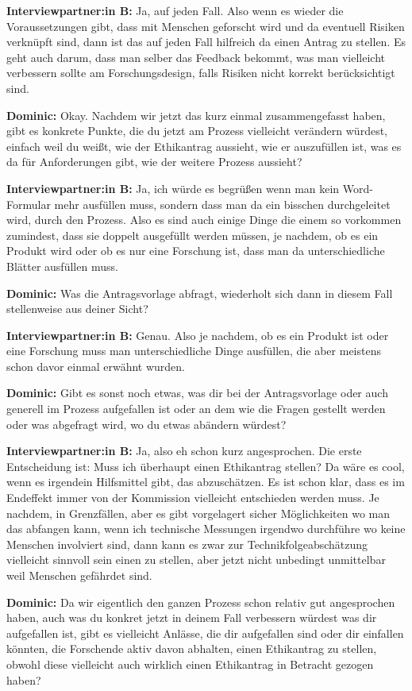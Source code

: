 \documentclass[a4paper,12pt,twoside]{scrreprt}
\begin{document}
\textbf{Interviewpartner:in B:} Ja, auf jeden Fall. Also wenn es wieder die Voraussetzungen gibt, dass mit Menschen geforscht wird und da eventuell Risiken verknüpft sind, dann ist das auf jeden Fall hilfreich da einen Antrag zu stellen. Es geht auch darum, dass man selber das Feedback bekommt, was man vielleicht verbessern sollte am Forschungsdesign, falls Risiken nicht korrekt berücksichtigt sind.

\textbf{Dominic:} Okay. Nachdem wir jetzt das kurz einmal zusammengefasst haben, gibt es konkrete Punkte, die du jetzt am Prozess vielleicht verändern würdest, einfach weil du weißt, wie der Ethikantrag aussieht, wie er auszufüllen ist, was es da für Anforderungen gibt, wie der weitere Prozess aussieht?

\textbf{Interviewpartner:in B:} Ja, ich würde es begrüßen wenn man kein Word-Formular mehr ausfüllen muss, sondern dass man da ein bisschen durchgeleitet wird, durch den Prozess. Also es sind auch einige Dinge die einem so vorkommen zumindest, dass sie doppelt ausgefüllt werden müssen, je nachdem, ob es ein Produkt wird oder ob es nur eine Forschung ist, dass man da unterschiedliche Blätter ausfüllen muss.

\textbf{Dominic:} Was die Antragsvorlage abfragt, wiederholt sich dann in diesem Fall stellenweise aus deiner Sicht?

\textbf{Interviewpartner:in B:} Genau. Also je nachdem, ob es ein Produkt ist oder eine Forschung muss man unterschiedliche Dinge ausfüllen, die aber meistens schon davor einmal erwähnt wurden.

\textbf{Dominic:} Gibt es sonst noch etwas, was dir bei der Antragsvorlage oder auch generell im Prozess aufgefallen ist oder an dem wie die Fragen gestellt werden oder was abgefragt wird, wo du etwas abändern würdest?

\textbf{Interviewpartner:in B:} Ja, also eh schon kurz angesprochen. Die erste Entscheidung ist: Muss ich überhaupt einen Ethikantrag stellen? Da wäre es cool, wenn es irgendein Hilfsmittel gibt, das abzuschätzen. Es ist schon klar, dass es im Endeffekt immer von der Kommission vielleicht entschieden werden muss. Je nachdem, in Grenzfällen, aber es gibt vorgelagert sicher Möglichkeiten wo man das abfangen kann, wenn ich technische Messungen irgendwo durchführe wo keine Menschen involviert sind, dann kann es zwar zur Technikfolgeabschätzung vielleicht sinnvoll sein einen zu stellen, aber jetzt nicht unbedingt unmittelbar weil Menschen gefährdet sind.

\textbf{Dominic:} Da wir eigentlich den ganzen Prozess schon relativ gut angesprochen haben, auch was du konkret jetzt in deinem Fall verbessern würdest was dir aufgefallen ist, gibt es vielleicht Anlässe, die dir aufgefallen sind oder dir einfallen könnten, die Forschende aktiv davon abhalten, einen Ethikantrag zu stellen, obwohl diese vielleicht auch wirklich einen Ethikantrag in Betracht gezogen haben?
\end{document}
